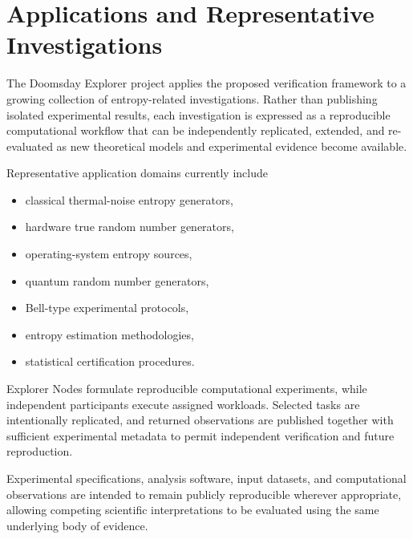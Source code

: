 \documentclass[11pt]{article}
\begin{document}

\section{Applications and Representative Investigations}

The Doomsday Explorer project applies the proposed verification
framework to a growing collection of entropy-related investigations.
Rather than publishing isolated experimental results,
each investigation is expressed as a reproducible computational
workflow that can be independently replicated,
extended,
and re-evaluated as new theoretical models and experimental evidence
become available.

Representative application domains currently include

\begin{itemize}

\item
classical thermal-noise entropy generators,

\item
hardware true random number generators,

\item
operating-system entropy sources,

\item
quantum random number generators,

\item
Bell-type experimental protocols,

\item
entropy estimation methodologies,

\item
statistical certification procedures.

\end{itemize}

Explorer Nodes formulate reproducible computational experiments,
while independent participants execute assigned workloads.
Selected tasks are intentionally replicated,
and returned observations are published together with sufficient
experimental metadata to permit independent verification and future
reproduction.

Experimental specifications,
analysis software,
input datasets,
and computational observations are intended to remain publicly
reproducible wherever appropriate,
allowing competing scientific interpretations to be evaluated using
the same underlying body of evidence.
\end{document}
